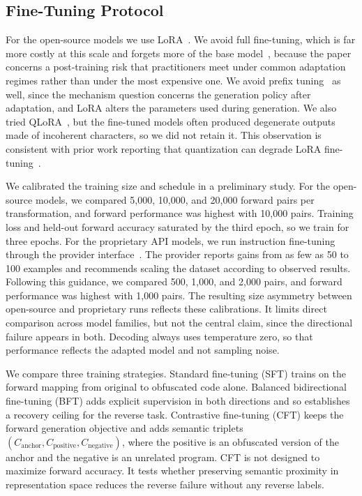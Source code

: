 \subsection{Fine-Tuning Protocol}
\label{sec:training_protocol}

For the open-source models we use LoRA~\cite{hu2022lora}. We avoid full
fine-tuning, which is far more costly at this scale and forgets more of the base
model~\cite{biderman2024lora}, because the paper concerns a post-training risk
that practitioners meet under common adaptation regimes rather than under the
most expensive one. We avoid prefix tuning~\cite{li2021prefix} as well, since
the mechanism question concerns the generation policy after adaptation, and LoRA
alters the parameters used during generation. We also tried QLoRA~\cite{dettmers2023qlora}, but the fine-tuned models often produced degenerate outputs made of incoherent characters, so we did not retain it.
This observation is consistent with prior work reporting that quantization can degrade LoRA fine-tuning~\cite{li2024loftq, qin2024irqlora}.

We calibrated the training size and schedule in a preliminary study. For the
open-source models, we compared 5{,}000, 10{,}000, and 20{,}000 forward pairs per
transformation, and forward performance was highest with 10{,}000 pairs. Training
loss and held-out forward accuracy saturated by the third epoch, so we train for
three epochs. For the proprietary API models, we run
instruction fine-tuning through the provider interface~\cite{openai_sft_guide}.
The provider reports gains from as few as 50 to 100 examples and recommends
scaling the dataset according to observed results. Following this guidance, we
compared 500, 1{,}000, and 2{,}000 pairs, and forward performance was highest
with 1{,}000 pairs. The resulting size asymmetry between open-source and
proprietary runs reflects these calibrations. It limits direct comparison across
model families, but not the central claim, since the directional failure appears
in both. Decoding always uses temperature zero, so that performance reflects the
adapted model and not sampling noise.

We compare three training strategies. Standard fine-tuning (SFT) trains on the
forward mapping from original to obfuscated code alone. Balanced bidirectional
fine-tuning (BFT) adds explicit supervision in both directions and so establishes
a recovery ceiling for the reverse task. Contrastive fine-tuning (CFT) keeps the
forward generation objective and adds semantic triplets
$(C_{\text{anchor}}, C_{\text{positive}}, C_{\text{negative}})$, where the
positive is an obfuscated version of the anchor and the negative is an unrelated
program. CFT is not designed to maximize forward accuracy. It tests whether
preserving semantic proximity in representation space reduces the reverse failure
without any reverse labels.
